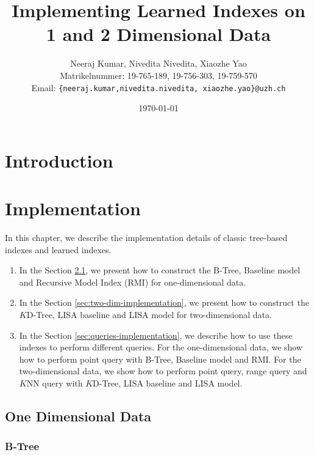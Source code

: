 \documentclass[a4paper,12pt]{scrreprt}
\title{Implementing Learned Indexes on 1 and 2 Dimensional Data}
\author{
  Neeraj Kumar, Nivedita Nivedita, Xiaozhe Yao\\[-5pt]
  \scriptsize Matrikelnummer: 19-765-189, 19-756-303, 19-759-570\\[-5pt]
  \scriptsize Email: \texttt{\{neeraj.kumar,nivedita.nivedita, xiaozhe.yao\}@uzh.ch}
}
\date{\vspace*{2cm}\today}
\newenvironment{mscsummary}{\fbox{Summary}}{\medskip}
\begin{document}
\begingroup
\let\newpage\relax%
\maketitle
\newpage\null\thispagestyle{blank}\newpage
\setcounter{page}{0}
\endgroup

\begin{abstract}

\end{abstract}

\setcounter{tocdepth}{2}
\tableofcontents 

\chapter{Introduction}



\chapter{Implementation}

\begin{mscsummary}
	In this chapter, we describe the implementation details of classic tree-based indexes and learned indexes.
	\begin{enumerate}
		\item In the Section \ref{sec:one-dim-implementation}, we present how to construct the B-Tree, Baseline model and Recursive Model Index (RMI) for one-dimensional data.
		\item In the Section \ref{sec:two-dim-implementation}, we present how to construct the $K$D-Tree, LISA baseline and LISA model for two-dimensional data.
		\item In the Section \ref{sec:queries-implementation}, we describe how to use these indexes to perform different queries. For the one-dimensional data, we show how to perform point query with B-Tree, Baseline model and RMI. For the two-dimensional data, we show how to perform point query, range query and $K$NN query with $K$D-Tree, LISA baseline and LISA model.
	\end{enumerate}
\end{mscsummary}

\section{One Dimensional Data}
\label{sec:one-dim-implementation}

\subsection{B-Tree}
\end{document}
